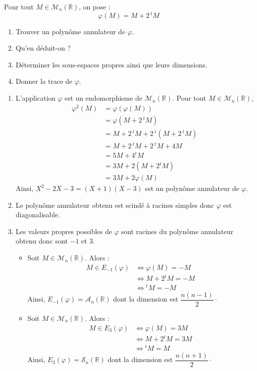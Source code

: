 \documentclass[a4paper,10pt]{report}
\begin{document}
\begin{Exercice}{}  Pour tout $M \in \mathcal{M}_n(\mathbb{R})$, on pose :
$$ \varphi(M) = M +2 \, {}^t M$$
\begin{enumerate}
\item Trouver un polynôme annulateur de $\varphi$.
\item Qu'en déduit-on ?
\item Déterminer les sous-espaces propres ainsi que leurs dimensions.
\item Donner la trace de $\varphi$.
\end{enumerate}
\end{Exercice}

\corr 

\begin{enumerate}
\item L'application $\varphi$ est un endomorphisme de $\mathcal{M}_n(\mathbb{R})$. Pour tout $M \in \mathcal{M}_n(\mathbb{R})$,
\begin{align*}
\varphi^2(M) & = \varphi(\varphi(M)) \\
& =  \varphi(M +2 \, {}^t M) \\
& = M +2 \, {}^t M +2 \, {}^t (M +2 \, {}^t M) \\
& = M +2 \, {}^t M +2 \, {}^t M +4M \\
& = 5M + 4{}^t M \\
& = 3M + 2(M +2{}^t M) \\
& = 3M + 2\varphi(M)
\end{align*}
Ainsi, $X^2-2X-3=(X+1)(X-3)$ est un polynôme annulateur de $\varphi$.
\item Le polynôme annulateur obtenu est scindé à racines simples donc $\varphi$ est diagonalisable.
\item Les valeurs propres possibles de $\varphi$ sont racines du polynôme annulateur obtenu donc sont $-1$ et $3$.
\begin{itemize}
\item Soit $M \in \mathcal{M}_n(\mathbb{R})$. Alors :
\begin{align*}
M \in E_{-1}(\varphi) & \Longleftrightarrow \varphi(M)=-M \\
& \Longleftrightarrow M +2{}^t M = -M \\
& \Longleftrightarrow {}^t M= - M 
\end{align*}
Ainsi, $E_{-1}(\varphi) = \mathcal{A}_n(\mathbb{R})$ dont la dimension est $\dfrac{n(n-1)}{2} \cdot$
\item Soit $M \in \mathcal{M}_n(\mathbb{R})$. Alors :
\begin{align*}
M \in E_{3}(\varphi) & \Longleftrightarrow \varphi(M)=3M \\
& \Longleftrightarrow M +2{}^t M = 3M \\
& \Longleftrightarrow {}^t M=  M 
\end{align*}
Ainsi, $E_{3}(\varphi) = \mathcal{S}_n(\mathbb{R})$ dont la dimension est $\dfrac{n(n+1)}{2}\cdot$
\end{itemize}


\end{enumerate}
\end{document}
